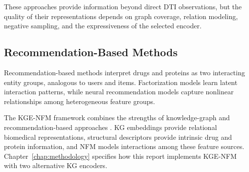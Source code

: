 These approaches provide information beyond direct DTI observations, but the
quality of their representations depends on graph coverage, relation modeling,
negative sampling, and the expressiveness of the selected encoder.

\subsection{Recommendation-Based Methods}

Recommendation-based methods interpret drugs and proteins as two interacting
entity groups, analogous to users and items. Factorization models learn latent
interaction patterns, while neural recommendation models capture nonlinear
relationships among heterogeneous feature groups.

The KGE-NFM framework combines the strengths of knowledge-graph and
recommendation-based approaches \cite{ye2021unified}. KG embeddings provide
relational biomedical representations, structural descriptors provide
intrinsic drug and protein information, and NFM models interactions among
these feature sources. Chapter~\ref{chap:methodology} specifies how this report
implements KGE-NFM with two alternative KG encoders.
